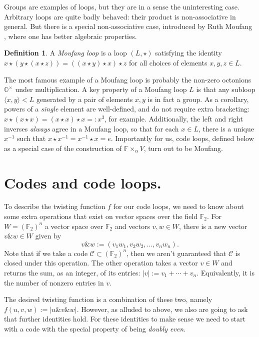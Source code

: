 \documentclass{article}
\theoremstyle{plain}
\theoremstyle{definition}
\newtheorem*{definition}{Definition}
\def \cC {\mathcal{C}}
\def \FF {\mathbb{F}}
\newcommand{\AND}{\mathbin{\texttt{\&}}}
\begin{document}
Groups are examples of loops, but they are in a sense the uninteresting case. Arbitrary loops are quite badly behaved: their product is non-associative in general. But there is a special non-associative case, introduced by Ruth Moufang \cite{Moufang}, where one has better algebraic properties.

\begin{definition}
A \emph{Moufang loop} is a loop $(L,\star)$ satisfying the identity $x \star (y \star (x \star z)) = ((x \star y) \star x) \star z$ for all choices of elements $x,y,z\in L$.
\end{definition}

The most famous example of a Moufang loop is probably the non-zero octonions $\mathbb{O}^\times$ under multiplication. A key property of a Moufang loop $L$ is that any subloop $\langle x,y\rangle < L$ generated by a pair of elements $x,y$ is in fact a group. As a corollary, powers of a \emph{single} element are well-defined, and do not require extra bracketing: $x\star (x \star x) = (x\star x) \star x =: x^3$, for example. Additionally, the left and right inverses \emph{always} agree in a Moufang loop, so that for each $x\in L$, there is a unique $x^{-1}$ such that $x\star x^{-1} = x^{-1}\star x = e$. Importantly for us, code loops, defined below as a special case of the construction of $\FF\times_\alpha V$, turn out to be Moufang.



\section{Codes and code loops.}

To describe the twisting function $f$ for our code loops, we need to know about some extra operations that exist on vector spaces over the field $\FF_2$. 
For $W=(\FF_2)^n$ a vector space over $\FF_2$ and vectors $v,w\in W$, there is a new vector $v\AND w \in W$ given by
\[
	v\AND w := (v_1w_1,v_2w_2,\ldots,v_nw_n).
\]
Note that if we take a code $\cC \subset (\FF_2)^n$, then we aren't guaranteed that $\cC$ is closed under this operation.
The other operation takes a vector $v\in W$ and returns the sum, as an integer, of its entries: $|v| := v_1 + \cdots + v_n$. Equivalently, it is the number of nonzero entries in $v$.

The desired twisting function is a combination of these two, namely $f(u,v,w) := |u\AND v\AND w|$.
However, as alluded to above, we also are going to ask that further identities hold. 
For these identities to make sense we need to start with a code with the special property of being \emph{doubly even}.
\end{document}
